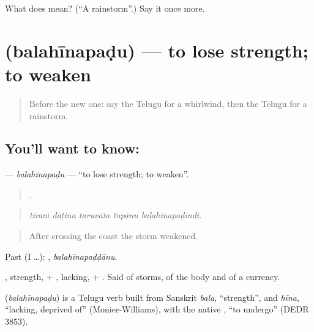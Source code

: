\begin{tcolorbox}[breakable,colback=teal!4,colframe=teal!35!black,title={Before you move on}]
What does  mean? (\textquotedblleft{}A rainstorm\textquotedblright{}.) Say it once more.
\end{tcolorbox}
\section[\texorpdfstring{\te{బలహీనపడు} (balahīnapaḍu)}{బలహీనపడు (balahīnapaḍu)}]{ (balahīnapaḍu) — to lose strength; to weaken}

\label{lesson:TE-C478-balahinapadu}



\begin{quote}
Before the new one: say the Telugu for a whirlwind, then the Telugu for a rainstorm.
\end{quote}

\subsection*{You'll want to know: }
\textbf{} — \emph{balahīnapaḍu} — \textquotedblleft{}to lose strength; to weaken\textquotedblright{}.

\begin{quote}
    .
\end{quote}

\begin{quote}
\emph{tīraṁ dāṭina taruvāta tupānu balahīnapaḍindi.}
\end{quote}

\begin{quote}
After crossing the coast the storm weakened.
\end{quote}

Past (I …): , \emph{balahīnapaḍḍānu}.

, strength, + , lacking, + . Said of storms, of the body and of a currency.

\begin{cousinweb}
\textbf{} (\emph{balahīnapaḍu}) is a Telugu verb built from Sanskrit \emph{bala}, \textquotedblleft{}strength\textquotedblright{}, and \emph{hīna}, \textquotedblleft{}lacking, deprived of\textquotedblright{} (Monier-Williams), with the native , \textquotedblleft{}to undergo\textquotedblright{} (DEDR 3853).
\end{cousinweb}

